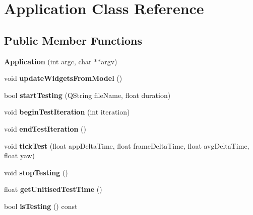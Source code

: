\hypertarget{class_application}{\section{\-Application \-Class \-Reference}
\label{class_application}
}
\subsection*{\-Public \-Member \-Functions}
\begin{DoxyCompactItemize}
\item 
\hypertarget{class_application_a758ec0591237b4b7204ee8d87a26f834}{{\bfseries \-Application} (int argc, char $\ast$$\ast$argv)}\label{class_application_a758ec0591237b4b7204ee8d87a26f834}

\item 
\hypertarget{class_application_a8cd1e6dfa67f059ca5c658a227d59f8d}{void {\bfseries update\-Widgets\-From\-Model} ()}\label{class_application_a8cd1e6dfa67f059ca5c658a227d59f8d}

\item 
\hypertarget{class_application_afa86ae36f44dd18f7fa4179423171811}{bool {\bfseries start\-Testing} (\-Q\-String file\-Name, float duration)}\label{class_application_afa86ae36f44dd18f7fa4179423171811}

\item 
\hypertarget{class_application_a195d234bdafebeb3f741e2bd94371f88}{void {\bfseries begin\-Test\-Iteration} (int iteration)}\label{class_application_a195d234bdafebeb3f741e2bd94371f88}

\item 
\hypertarget{class_application_a5e7305d3df1f8c3e861ff6b9b4cb93a9}{void {\bfseries end\-Test\-Iteration} ()}\label{class_application_a5e7305d3df1f8c3e861ff6b9b4cb93a9}

\item 
\hypertarget{class_application_a457a4403f77a68c22a26deb376bb99bc}{void {\bfseries tick\-Test} (float app\-Delta\-Time, float frame\-Delta\-Time, float avg\-Delta\-Time, float yaw)}\label{class_application_a457a4403f77a68c22a26deb376bb99bc}

\item 
\hypertarget{class_application_a285f66dd03abd24995c5aaa7e3e3d92b}{void {\bfseries stop\-Testing} ()}\label{class_application_a285f66dd03abd24995c5aaa7e3e3d92b}

\item 
\hypertarget{class_application_ac7bb41753d290b71cad1dbae09e061d4}{float {\bfseries get\-Unitised\-Test\-Time} ()}\label{class_application_ac7bb41753d290b71cad1dbae09e061d4}

\item 
\hypertarget{class_application_a87fc9521a01f2baa155bfdfbae282c53}{bool {\bfseries is\-Testing} () const }\label{class_application_a87fc9521a01f2baa155bfdfbae282c53}

\end{DoxyCompactItemize}
